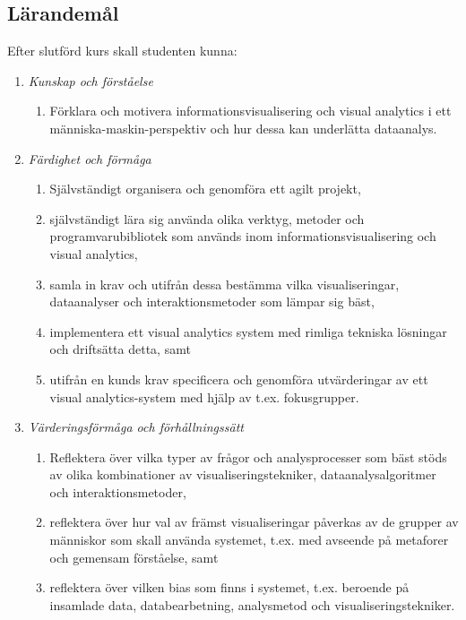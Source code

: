 \subsection*{Lärandemål}

Efter slutförd kurs skall studenten kunna:

\begin{enumerate}
\def\labelenumi{\Alph{enumi}.}
\tightlist
\item
  \emph{Kunskap och förståelse}

  \begin{enumerate}
  \def\labelenumii{\Alph{enumi}.\arabic{enumii}.}
  \tightlist
  \item
    Förklara och motivera informationsvisualisering och visual analytics
    i ett människa-maskin-perspektiv och hur dessa kan underlätta
    dataanalys.
  \end{enumerate}
\item
  \emph{Färdighet och förmåga}

  \begin{enumerate}
  \def\labelenumii{\Alph{enumi}.\arabic{enumii}.}
  \tightlist
  \item
    Självständigt organisera och genomföra ett agilt projekt,
  \item
    självständigt lära sig använda olika verktyg, metoder och
    programvarubibliotek som används inom informationsvisualisering och
    visual analytics,
  \item
    samla in krav och utifrån dessa bestämma vilka visualiseringar,
    dataanalyser och interaktionsmetoder som lämpar sig bäst,
  \item
    implementera ett visual analytics system med rimliga tekniska
    lösningar och driftsätta detta, samt
  \item
    utifrån en kunds krav specificera och genomföra utvärderingar av ett
    visual analytics-system med hjälp av t.ex. fokusgrupper.
  \end{enumerate}
\item
  \emph{Värderingsförmåga och förhållningssätt}

  \begin{enumerate}
  \def\labelenumii{\Alph{enumi}.\arabic{enumii}.}
  \tightlist
  \item
    Reflektera över vilka typer av frågor och analysprocesser som bäst
    stöds av olika kombinationer av visualiseringstekniker,
    dataanalysalgoritmer och interaktionsmetoder,
  \item
    reflektera över hur val av främst visualiseringar påverkas av de
    grupper av människor som skall använda systemet, t.ex. med avseende
    på metaforer och gemensam förståelse, samt
  \item
    reflektera över vilken bias som finns i systemet, t.ex. beroende på
    insamlade data, databearbetning, analysmetod och
    visualiseringstekniker.
  \end{enumerate}
\end{enumerate}

